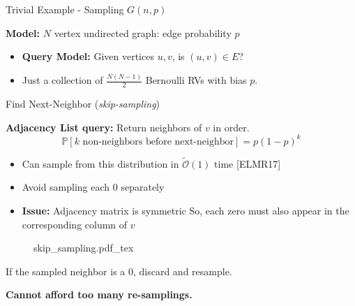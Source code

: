\begin{block}{Trivial Example - Sampling $G(n, p)$}

\textbf{Model:} $N$ vertex undirected graph: edge probability $p$


\begin{itemize}
    \item [] \textbf{Query Model:} Given vertices $u, v$, is $(u,v)\in E$?
    \item Just a collection of $\frac{N(N-1)}{2}$ Bernoulli RVs with bias $p$.
\end{itemize}

\end{block}

\begin{block}{Find Next-Neighbor (\emph{skip-sampling})}

\textbf{Adjacency List query:} Return neighbors of $v$ in order.
\[ \mathbb P[k \textrm{ non-neighbors before next-neighbor}] = p(1-p)^k \]
\vspace{-3.5ex}
\begin{itemize}
    \item Can sample from this distribution in $\tilde{\mathcal O}(1)$ time [ELMR17]
    \item Avoid sampling each $0$ separately
    \item [] \textbf{Issue:} Adjacency matrix is symmetric
          So, each zero must also appear in the corresponding column of $v$
\end{itemize}

\begin{figure}[h!]\centering
    \def\svgwidth{0.9\columnwidth}
    {skip_sampling.pdf_tex}
\end{figure}
If the sampled neighbor is a $0$, discard and resample.

\textbf{Cannot afford too many re-samplings.}

\end{block}
